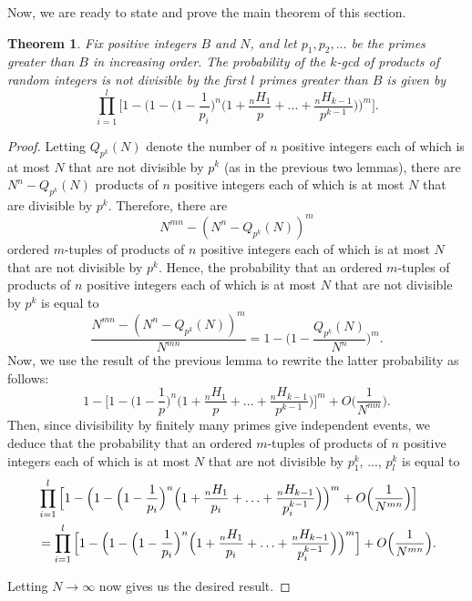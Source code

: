\documentclass[12pt]{amsart}
\newtheorem{theorem}{Theorem}[subsection]
\theoremstyle{definition}
\begin{document}
Now, we are ready to state and prove the main theorem of this section.

\begin{theorem}
	Fix positive integers $B$ and $N$, and let $p_1, p_2, ...$ be the primes greater than $B$ in increasing order. The probability of the $k$-gcd of products of random integers is not divisible by the first $l$ primes greater than $B$ is given by 
	$$\prod_{i=1}^{l} \Big[1 - \Big(1 - \Big(1-\frac{1}{p_i}\Big)^n \Big(1 + \frac{{}_nH_1}{p} + ... + \frac{{}_nH_{k-1}}{p^{k-1}}\Big)\Big)^m\Big].$$
\end{theorem}

\begin{proof}
	Letting $Q_{p^k}(N)$ denote the number of $n$ positive integers each of which is at most $N$ that are not divisible by $p^k$ (as in the previous two lemmas), there are $N^n - Q_{p^k}(N)$ products of $n$ positive integers each of which is at most $N$ that are divisible by $p^k$. Therefore, there are 
	$$N^{mn} - (N^n - Q_{p^k}(N))^m$$
	ordered $m$-tuples of products of $n$ positive integers each of which is at most $N$ that are not divisible by $p^k$.
	Hence, the probability that an ordered $m$-tuples of products of $n$ positive integers each of which is at most $N$ that are not divisible by $p^k$ is equal to
	$$\frac{N^{mn} - (N^n - Q_{p^k}(N))^m}{N^{mn}} = 1 - \Big(1 - \frac{Q_{p^k}(N)}{N^n}\Big)^m.$$
	Now, we use the result of the previous lemma to rewrite the latter probability as follows:
	$$1 - \Big[1 - \Big(1 - \frac{1}{p}\Big)^n \Big(1 + \frac{{}_nH_1}{p} + ... + \frac{{}_nH_{k-1}}{p^{k-1}}\Big)\Big]^m + O\Big(\frac{1}{N^{mn}}\Big).$$
	Then, since divisibility by finitely many primes give independent events, we deduce that the probability that an ordered $m$-tuples of products of $n$ positive integers each of which is at most $N$ that are not divisible by $p_1^k$, ..., $p_l^k$ is equal to
	\begin{align*} &\prod_{i=1}^l \Big[1 - \Big(1 -\Big(1-\frac{1}{p_i}\Big)^n\Big(1+\frac{{}_nH_1}{p_i}+\mathellipsis+\frac{{}_nH_{k-1}}{p_i^{k-1}}\Big)\Big)^m +O\Big(\frac{1}{N^{mn}}\Big) \Big]\\
		&=\prod_{i=1}^l \Big[1 - \Big(1 -\Big(1-\frac{1}{p_i}\Big)^n\Big(1+\frac{{}_nH_1}{p_i}+\mathellipsis+\frac{{}_nH_{k-1}}{p_i^{k-1}}\Big)\Big)^m\Big] + O\Big(\frac{1}{N^{mn}}\Big). \end{align*}
	
	\noindent Letting $N \to \infty$ now gives us the desired result.
\end{proof}
\end{document}
